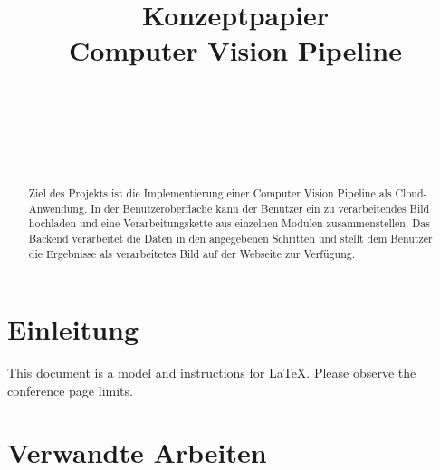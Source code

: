 \documentclass[conference]{IEEEtran}
\begin{document}
\title{Konzeptpapier
	\\Computer Vision Pipeline}

\author{

	\\
	
	\and
	
	\\
	
	\and
	
	\\
	
}


\maketitle

\begin{abstract}
	Ziel des Projekts ist die Implementierung einer Computer Vision Pipeline als Cloud-Anwendung. In der Benutzeroberfläche kann der Benutzer ein zu verarbeitendes Bild hochladen und eine Verarbeitungskette aus einzelnen Modulen zusammenstellen. Das Backend verarbeitet die Daten in den angegebenen Schritten und stellt dem Benutzer die Ergebnisse als verarbeitetes Bild auf der Webseite zur Verfügung.
\end{abstract}


\section{Einleitung}

This document is a model and instructions for \LaTeX.
Please observe the conference page limits.




\section{Verwandte Arbeiten}
\end{document}
